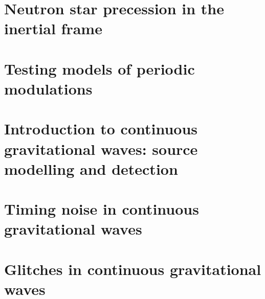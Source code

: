 \documentclass[twoside]{thesis}
\begin{document}
\chapter{Neutron star precession in the inertial frame}

\chapter{Testing models of periodic modulations}
\label{sec: }


\chapter{Introduction to continuous gravitational waves: source modelling and detection}

\chapter{Timing noise in continuous gravitational waves}
\label{sec: timing noise in cgw}


\chapter{Glitches in continuous gravitational waves}



\end{document}
